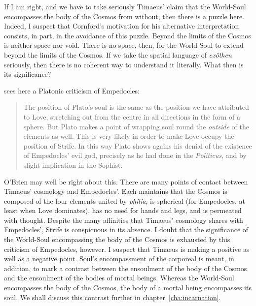 If I am right, and we have to take seriously Timaeus' claim that the World-Soul encompasses the body of the Cosmos from without, then there is a puzzle here. Indeed, I suspect that Cornford's motivation for his alternative interpretation consists, in part, in the avoidance of this puzzle. Beyond the limits of the Cosmos is neither space nor void. There is no space, then, for the World-Soul to extend beyond the limits of the Cosmos. If we take the spatial language of \emph{exōthen} seriously, then there is no coherent way to understand it literally. What then is its significance? 

\citet[144--5]{OBrien:1969ty} sees here a Platonic criticism of Empedocles:
\begin{quote}
	The position of Plato's soul is the same as the position we have attributed to Love, stretching out from the centre in all directions in the form of a sphere. But Plato makes a point of wrapping soul round the \emph{outside} of the elements as well. This is very likely in order to make Love occupy the position of Strife. In this way Plato shows agains his denial of the existence of Empedocles' evil god, precisely as he had done in the \emph{Politicus}, and by slight implication in the Sophist. \citep[145]{OBrien:1969ty}
\end{quote}
O'Brien may well be right about this. There are many points of contact between Timaeus' cosmology and Empedocles'. Each maintains that the Cosmos is composed of the four elements united by \emph{philia}, is spherical (for Empedocles, at least when Love dominates), has no need for hands and legs, and is permeated with thought. Despite the many affinities that Timaeus' cosmology shares with Empedocles', Strife is conspicuous in its absence. I doubt that the significance of the World-Soul encompassing the body of the Cosmos is exhausted by this criticism of Empedocles, however. I suspect that Timaeus is making a positive as well as a negative point. Soul's encompassment of the corporeal is meant, in addition, to mark a contrast between the ensoulment of the body of the Cosmos and the ensoulment of the bodies of mortal beings. Whereas the World-Soul encompasses the body of the Cosmos, the body of a mortal being encompasses its soul. We shall discuss this contrast further in chapter~\ref{cha:incarnation}.

